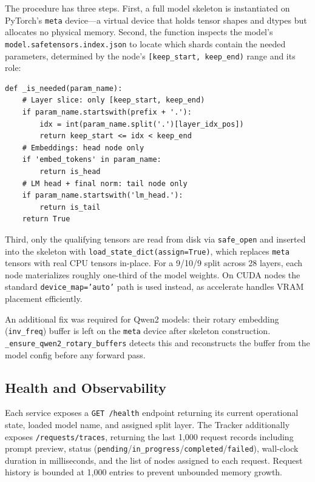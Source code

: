 \documentclass[conference]{IEEEtran}
\begin{document}
The procedure has three steps. First, a full model skeleton is instantiated
on PyTorch's \texttt{meta} device---a virtual device that holds tensor shapes
and dtypes but allocates no physical memory. Second, the function inspects the
model's \texttt{model.safetensors.index.json} to locate which shards contain
the needed parameters, determined by the node's \texttt{[keep\_start,
keep\_end)} range and its role:

\begin{lstlisting}[caption={Selective safetensors loading in \texttt{\_load\_slice\_cpu}.}, label={lst:devmap}]
def _is_needed(param_name):
    # Layer slice: only [keep_start, keep_end)
    if param_name.startswith(prefix + '.'):
        idx = int(param_name.split('.')[layer_idx_pos])
        return keep_start <= idx < keep_end
    # Embeddings: head node only
    if 'embed_tokens' in param_name:
        return is_head
    # LM head + final norm: tail node only
    if param_name.startswith('lm_head.'):
        return is_tail
    return True
\end{lstlisting}

Third, only the qualifying tensors are read from disk via \texttt{safe\_open}
and inserted into the skeleton with \texttt{load\_state\_dict(assign=True)},
which replaces \texttt{meta} tensors with real CPU tensors in-place. For a
9/10/9 split across 28 layers, each node materializes roughly one-third of the
model weights. On CUDA nodes the standard \texttt{device\_map='auto'} path is
used instead, as accelerate handles VRAM placement efficiently.

An additional fix was required for Qwen2 models: their rotary embedding
(\texttt{inv\_freq}) buffer is left on the \texttt{meta} device after
skeleton construction. \texttt{\_ensure\_qwen2\_rotary\_buffers} detects this
and reconstructs the buffer from the model config before any forward pass.

\subsection{Health and Observability}

Each service exposes a \texttt{GET /health} endpoint returning its current
operational state, loaded model name, and assigned split layer. The Tracker
additionally exposes \texttt{/requests/traces}, returning the last 1,000
request records including prompt preview, status
(\texttt{pending}/\texttt{in\_progress}/\texttt{completed}/\texttt{failed}),
wall-clock duration in milliseconds, and the list of nodes assigned to each
request. Request history is bounded at 1,000 entries to prevent unbounded
memory growth.
\end{document}
